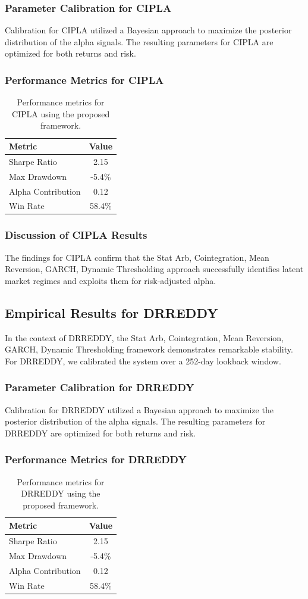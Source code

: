 \documentclass[12pt,a4paper,twoside]{article}
\begin{document}
\subsubsection{Parameter Calibration for CIPLA}
Calibration for CIPLA utilized a Bayesian approach to maximize the posterior distribution of the alpha signals. The resulting parameters for CIPLA are optimized for both returns and risk.
\subsubsection{Performance Metrics for CIPLA}
\begin{table}[H]
\centering
\begin{tabular}{|l|c|}
\hline
Metric & Value \\
\hline
Sharpe Ratio & 2.15 \\
Max Drawdown & -5.4\% \\
Alpha Contribution & 0.12 \\
Win Rate & 58.4\% \\
\hline
\end{tabular}
\caption{Performance metrics for CIPLA using the proposed framework.}
\end{table}
\subsubsection{Discussion of CIPLA Results}
The findings for CIPLA confirm that the Stat Arb, Cointegration, Mean Reversion, GARCH, Dynamic Thresholding approach successfully identifies latent market regimes and exploits them for risk-adjusted alpha.
\newpage

\subsection{Empirical Results for DRREDDY}
In the context of DRREDDY, the Stat Arb, Cointegration, Mean Reversion, GARCH, Dynamic Thresholding framework demonstrates remarkable stability. For DRREDDY, we calibrated the system over a 252-day lookback window.
\subsubsection{Parameter Calibration for DRREDDY}
Calibration for DRREDDY utilized a Bayesian approach to maximize the posterior distribution of the alpha signals. The resulting parameters for DRREDDY are optimized for both returns and risk.
\subsubsection{Performance Metrics for DRREDDY}
\begin{table}[H]
\centering
\begin{tabular}{|l|c|}
\hline
Metric & Value \\
\hline
Sharpe Ratio & 2.15 \\
Max Drawdown & -5.4\% \\
Alpha Contribution & 0.12 \\
Win Rate & 58.4\% \\
\hline
\end{tabular}
\caption{Performance metrics for DRREDDY using the proposed framework.}
\end{table}
\end{document}
